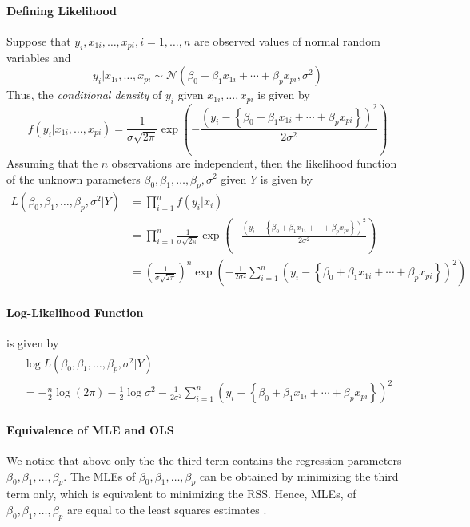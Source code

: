 \documentclass[10pt]{article}
\begin{document}
\paragraph{Defining Likelihood}
Suppose that $y_{i}, x_{1 i}, \ldots, x_{p i}, i=1, \ldots, n$ are observed values of normal random variables and
\begin{equation*}
    y_{i} | x_{1 i}, \ldots, x_{p i} \sim \mathcal{N}\left(\beta_{0}+\beta_{1} x_{1 i}+\cdots+\beta_{p} x_{p i}, \sigma^{2}\right)
\end{equation*}
Thus, the \textit{conditional density} of $y_i$ given $x_{1 i}, \ldots, x_{p i}$ is given by
\begin{equation*}
    f\left(y_{i} | x_{1 i}, \ldots, x_{p i}\right)=\frac{1}{\sigma \sqrt{2 \pi}} \exp \left(-\frac{\left(y_{i}-\left\{\beta_{0}+\beta_{1} x_{1 i}+\cdots+\beta_{p} x_{p i}\right\}\right)^{2}}{2 \sigma^{2}}\right)
\end{equation*}
Assuming that the $n$ observations are independent, then the likelihood function of the unknown parameters $\beta_{0}, \beta_{1}, \dots, \beta_{p}, \sigma^{2}$ given $Y$ is given by
\begin{align*}
    L\left(\beta_{0}, \beta_{1}, \ldots, \beta_{p}, \sigma^{2} | Y\right)
    &=\prod_{i=1}^{n} f\left(y_{i} | x_{i}\right) \\
    &=\prod_{i=1}^{n} \frac{1}{\sigma \sqrt{2 \pi}} \exp \left(-\frac{\left(y_{i}-\left\{\beta_{0}+\beta_{1} x_{1 i}+\cdots+\beta_{p} x_{p i}\right\}\right)^{2}}{2 \sigma^{2}}\right) \\
    &=\left(\frac{1}{\sigma \sqrt{2 \pi}}\right)^{n} \exp \left(-\frac{1}{2 \sigma^{2}} \sum_{i=1}^{n}\left(y_{i}-\left\{\beta_{0}+\beta_{1} x_{1 i}+\cdots+\beta_{p} x_{p i}\right\}\right)^{2}\right)
\end{align*}
\paragraph{Log-Likelihood Function} is given by
\begin{multline*}
    \log L\left(\beta_{0}, \beta_{1}, \ldots, \beta_{p}, \sigma^{2} | Y\right) \\
    =-\frac{n}{2} \log (2 \pi)-\frac{1}{2} \log \sigma^{2}-\frac{1}{2 \sigma^{2}} \sum_{i=1}^{n}\left(y_{i}-\left\{\beta_{0}+\beta_{1} x_{1 i}+\cdots+\beta_{p} x_{p i}\right\}\right)^{2}
\end{multline*}
\paragraph{Equivalence of MLE and OLS} We notice that above only the the third term contains the regression parameters $\beta_{0}, \beta_{1}, \ldots, \beta_{p}$. The MLEs of $\beta_{0}, \beta_{1}, \ldots, \beta_{p}$ can be obtained by minimizing the third term only, which is equivalent to minimizing the RSS. Hence, \color{BurntOrange} MLEs, of $\beta_{0}, \beta_{1}, \ldots, \beta_{p}$ are equal to the least squares estimates \color{Black}.
\end{document}
